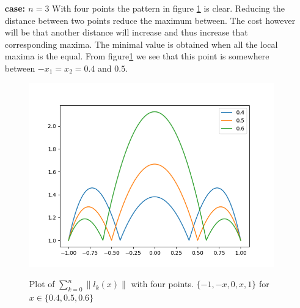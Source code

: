 \begin{solution}
\begin{enumerate}
\item[{\bf case: $n=3$}] With four points the pattern in figure \ref{fig:4n3} is clear. Reducing the distance between two points
  reduce the maximum between. The cost however will be that another
  distance will increase and thus increase that corresponding
  maxima. The minimal value is obtained when all the local maxima is
  the    equal. From figure\ref{fig:4n3} we see that this point is
  somewhere between $-x_1 = x_2 = 0.4$ and $0.5$. 
  \begin{figure}[!ht]
      \centering \includegraphics[scale = 0.5]{code/task_4_n3.png}\label{fig:4n3}
      \caption{Plot of $\sum_{k=0}^n\|l_k(x)\|$ with four
        points. $\{-1, -x, 0, x, 1\}$ for $x \in \{0.4, 0.5, 0.6\}$}
  \end{figure}
\end{enumerate}
\end{solution}

